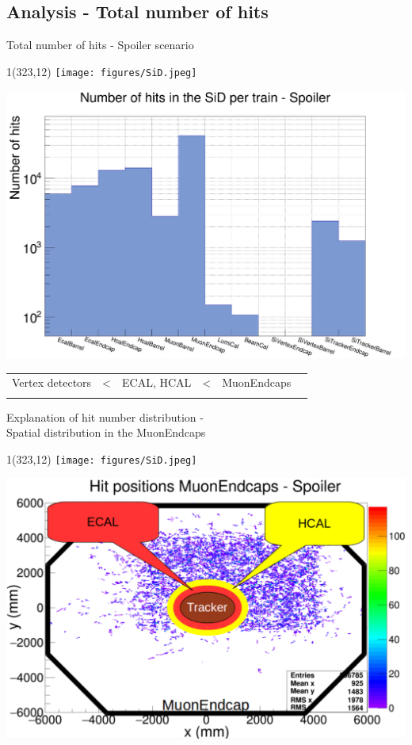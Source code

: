 \documentclass[xcolor={dvipsnames}]{beamer}
\newcommand{\sidlogo}{
  \setlength{\TPHorizModule}{1pt}
  \setlength{\TPVertModule}{1pt}
  \begin{textblock}{1}(323,12)
   \texttt{[image: figures/SiD.jpeg]}
  \end{textblock}
  }
\begin{document}
\subsection{Analysis - Total number of hits}
\begin{frame}{Total number of hits - \small Spoiler scenario}
\sidlogo
 \begin{center}
\includegraphics[height=0.65\textheight]{Number_Hits_per_Subdetector.pdf}\\
\begin{tabular}{@{}p{}p{}p{}p{}p{}p{}@{}}
 \centering Vertex detectors & < & \centering ECAL, HCAL & < & \centering MuonEndcaps & \\
  \centering{\scriptsize Smallest effective detector area} & &  \centering{\scriptsize Particle showers} & &  \centering{\scriptsize Biggest effective detector area}&
\end{tabular}
\end{center}
\end{frame}
\begin{frame}{Explanation of hit number distribution -\\ \small Spatial distribution in the MuonEndcaps}
\sidlogo
 \begin{center}
\includegraphics[height=0.78\textheight]{Explanation_Hits_Subdetectors.pdf}
\end{center}
\end{frame}
\end{document}
